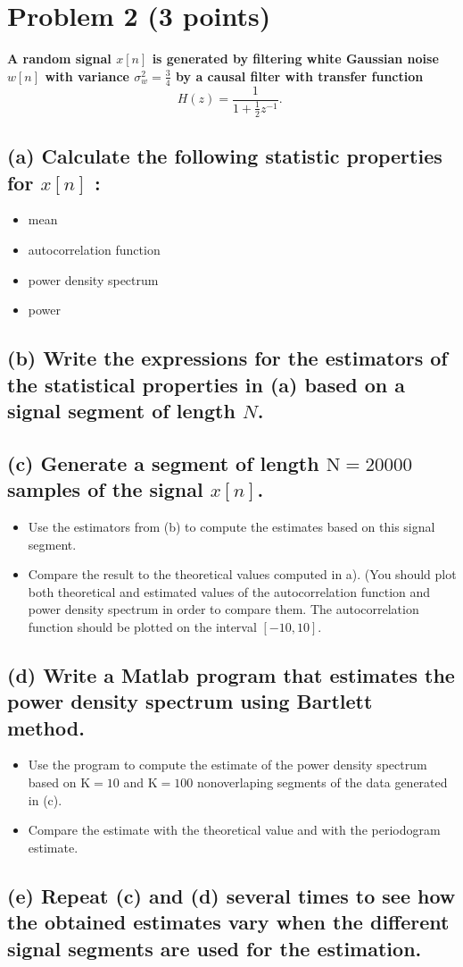 \section{Problem 2 (3 points)}
\textbf{A random signal $x[n]$ is generated by filtering white Gaussian noise $w[n]$ with variance $\sigma_w^2=\frac{3}{4}$ by a causal filter with transfer function}
$$
H(z)=\frac{1}{1+\frac{1}{2} z^{-1}} \text {. }
$$
\subsection*{(a) Calculate the following statistic properties for $x[n]$ :}
\begin{itemize}
    \item mean
    \item autocorrelation function
    \item power density spectrum
    \item power
\end{itemize}



\subsection*{(b) Write the expressions for the estimators of the statistical properties in (a) based on a signal segment of length $N$.}


\subsection*{(c) Generate a segment of length $\mathrm{N}=20000$ samples of the signal $x[n]$.}
\begin{itemize}
    \item Use the estimators from (b) to compute the estimates based on this signal segment.
    \item Compare the result to the theoretical values computed in a). (You should plot both theoretical and estimated values of the autocorrelation function and power density spectrum in order to compare them. The autocorrelation function should be plotted on the interval $[-10,10]$.
\end{itemize}


\subsection*{(d) Write a Matlab program that estimates the power density spectrum using Bartlett method.}
\begin{itemize}
    \item Use the program to compute the estimate of the power density spectrum based on $\mathrm{K}=10$ and $\mathrm{K}=100$ nonoverlaping segments of the data generated in (c).
    \item Compare the estimate with the theoretical value and with the periodogram estimate.
\end{itemize}


\subsection*{(e) Repeat (c) and (d) several times to see how the obtained estimates vary when the different signal segments are used for the estimation.}